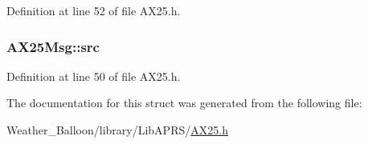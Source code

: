 Definition at line 52 of file A\+X25.\+h.

\subsubsection[{\texorpdfstring{src}{src}}]{ A\+X25\+Msg\+::src}\hypertarget{struct_a_x25_msg_a1f0571ab6f708e1725ad9a8be8e6b28a}{}\label{struct_a_x25_msg_a1f0571ab6f708e1725ad9a8be8e6b28a}


Definition at line 50 of file A\+X25.\+h.



The documentation for this struct was generated from the following file\+:\begin{DoxyCompactItemize}
\item 
Weather\+\_\+\+Balloon/library/\+Lib\+A\+P\+R\+S/\hyperlink{_a_x25_8h}{A\+X25.\+h}\end{DoxyCompactItemize}
